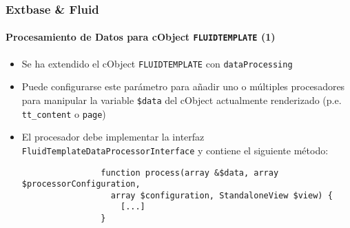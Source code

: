 \begin{frame}[fragile]
	\frametitle{Extbase \& Fluid}
	\framesubtitle{Procesamiento de Datos para cObject \texttt{FLUIDTEMPLATE} (1)}

	\lstset{basicstyle=\smaller\ttfamily}

	\begin{itemize}

		\item Se ha extendido el cObject \texttt{FLUIDTEMPLATE} con \texttt{dataProcessing}

		\item Puede configurarse este parámetro para añadir uno o múltiples procesadores para
			manipular la variable \texttt{\$data} del cObject actualmente renderizado\newline
			(p.e. \texttt{tt\_content} o \texttt{page})

		\item El procesador debe implementar la interfaz
			\texttt{FluidTemplateDataProcessorInterface} y contiene el siguiente método:

			\begin{lstlisting}
				function process(array &$data, array $processorConfiguration,
				  array $configuration, StandaloneView $view) {
				    [...]
				}
			\end{lstlisting}

	\end{itemize}

\end{frame}


